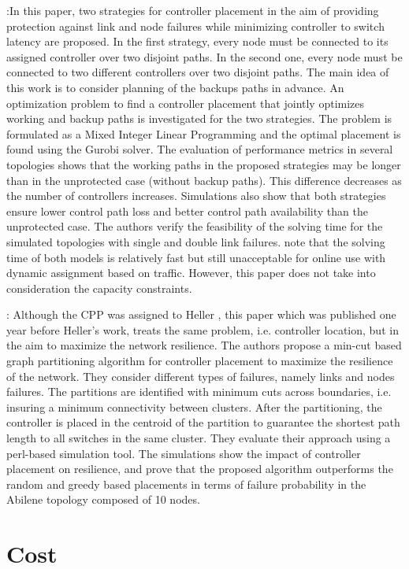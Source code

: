 \documentclass[a4paper,10pt]{article}
\begin{document}
\cite{ViMa16}:In this paper, two strategies for controller placement in the aim of providing protection against link and node failures while minimizing controller to switch latency  are proposed. In the first strategy, every node must be connected to its assigned controller over two disjoint paths. In the second one, every node must be connected to two different controllers over two disjoint paths. The main idea of this work is to consider planning of the backups paths in advance. An optimization problem to find a controller placement that jointly optimizes working and backup paths is investigated for the two strategies. The problem is formulated as a Mixed Integer Linear Programming and the optimal placement is found using the Gurobi solver. The evaluation of performance metrics in several topologies shows that the working paths in the proposed strategies may be longer than in the unprotected case (without backup paths). This difference decreases as the number of controllers increases. Simulations also show that both strategies ensure lower control path loss and better control path availability than the unprotected case. The authors verify the feasibility of the solving time for the simulated topologies with single and double link failures. note that the solving time of both models is relatively fast but still unacceptable for online use with dynamic assignment based on traffic. However, this paper does not take into consideration the capacity constraints.

\cite{ZhBe11}: Although the CPP was assigned to Heller \cite{HeSh12}, this paper which was published one year before Heller's work, treats the same problem, i.e. controller location, but in the aim to maximize the network resilience. The authors propose a min-cut based graph partitioning algorithm for controller placement to maximize the resilience of the network. They consider different types of failures, namely links and nodes failures. The partitions are identified with minimum cuts across boundaries, i.e. insuring a minimum connectivity between clusters. After the partitioning, the controller is placed in the centroid of the partition to guarantee the shortest path length to all switches in the same cluster. They evaluate their approach using a perl-based simulation tool. The simulations show the impact of controller placement on resilience, and prove that the proposed algorithm outperforms the random and greedy based placements in terms of failure probability in the Abilene topology composed of 10 nodes. 

\section{Cost}
\end{document}
